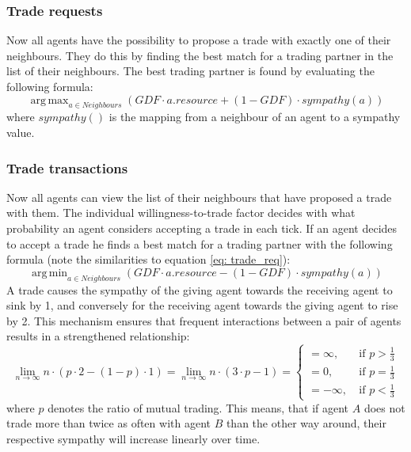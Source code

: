 \documentclass{JASSS}
\DeclareMathOperator*{\argmin}{arg\,min}
\DeclareMathOperator*{\argmax}{arg\,max}
\newcommand{\gdf}{\mathit{GDF}}
\begin{document}
\subsubsection{Trade requests}
	Now all agents have the possibility to propose a trade with exactly one of their neighbours. They do this by finding the best match for a trading partner in the list of their neighbours. The best trading partner is found by evaluating the following formula:
	\begin{equation}\label{eq: trade_req}
		\argmax_{a \in \mathit{Neighbours}} \left( \gdf \cdot a.\mathit{resource} + (1-\gdf) \cdot \mathit{sympathy}(a) \right)
	\end{equation}
	where $sympathy()$ is the mapping from a neighbour of an agent to a sympathy value.
	
	
\subsubsection{Trade transactions}
	 Now all agents can view the list of their neighbours that have proposed a trade with them. The individual willingness-to-trade factor decides with what probability an agent considers accepting a trade in each tick. If an agent decides to accept a trade he finds a best match for a trading partner with the following formula (note the similarities to equation \ref{eq: trade_req}):
	 \begin{equation}
		 \argmin_{a \in \mathit{Neighbours}} \left( \gdf \cdot a.\mathit{resource} - (1-\gdf) \cdot \mathit{sympathy}(a) \right)
	 \end{equation}
	 A trade causes the sympathy of the giving agent towards the receiving agent to sink by 1, and conversely for the receiving agent towards the giving agent to rise by 2. This mechanism ensures that frequent interactions between a pair of agents results in a strengthened relationship:
	 \begin{equation}
	 	\lim_{n \to \infty} n \cdot (p\cdot 2 - (1 - p)\cdot 1) = \lim_{n \to \infty} n \cdot (3\cdot p - 1) = \begin{cases}
	 	= \infty,\quad &\text{if $p > \frac{1}{3}$}\\
	 		= 0, &\text{if $p = \frac{1}{3}$}\\
	 		= -\infty, &\text{if $p < \frac{1}{3}$}
	 	\end{cases}
	 \end{equation}
	 where $p$ denotes the ratio of mutual trading. This means, that if agent $A$ does not trade more than twice as often with agent $B$ than the other way around, their respective sympathy will increase linearly over time.
\end{document}
